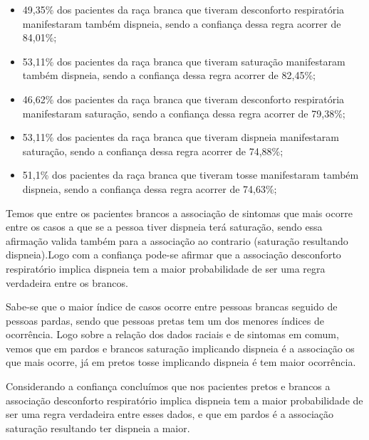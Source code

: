 \documentclass[tcc1]{uftex}
\begin{document}
    \begin{itemize}
    
    \item 49,35\% dos pacientes da raça branca que tiveram desconforto respiratória manifestaram também dispneia, sendo a confiança dessa regra acorrer de 84,01\%;
    
    \item 53,11\% dos pacientes da raça branca que tiveram saturação manifestaram também dispneia, sendo a confiança dessa regra acorrer de 82,45\%;
    
    \item 46,62\% dos pacientes da raça branca que tiveram desconforto respiratória manifestaram saturação, sendo a confiança dessa regra acorrer de 79,38\%;
    
    \item 53,11\% dos pacientes da raça branca que tiveram dispneia manifestaram saturação, sendo a confiança dessa regra acorrer de 74,88\%;
    
    \item 51,1\% dos pacientes da raça branca que tiveram tosse manifestaram também dispneia, sendo a confiança dessa regra acorrer de 74,63\%;
    \end{itemize}
    
    Temos que entre os pacientes brancos a associação de sintomas que mais ocorre entre os casos a que se a pessoa tiver dispneia terá saturação, sendo essa afirmação valida também para a associação ao contrario (saturação resultando dispneia).Logo com a confiança pode-se afirmar que a associação desconforto respiratório implica dispneia tem a maior probabilidade de ser uma regra verdadeira entre os brancos.
    
    Sabe-se que o maior índice de casos ocorre entre pessoas brancas seguido de pessoas pardas, sendo que pessoas pretas tem um dos menores índices de ocorrência. Logo sobre a relação dos dados raciais e de sintomas em comum, vemos que em pardos e brancos saturação implicando dispneia é a associação os que mais ocorre, já em pretos tosse implicando dispneia é tem maior ocorrência. 
    
    Considerando a confiança concluímos que nos pacientes pretos e brancos a associação desconforto respiratório implica dispneia tem a maior probabilidade de ser uma regra verdadeira entre esses dados, e que em pardos é a associação saturação resultando ter dispneia a maior.
    
\end{document}
